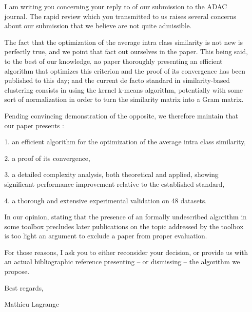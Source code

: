 \documentclass[a4paper,fleqn]{article}
\begin{document}
I am writing you concerning your reply to of our submission to the ADAC journal. The rapid review which you transmitted to us raises several concerns about our submission that we believe are not quite admissible.

The fact that the optimization of the average intra class similarity is not new is perfectly true, and we point that fact out ourselves in the paper. This being said, to the best of our knowledge, no paper thoroughly presenting an efficient algorithm that optimizes this criterion and the proof of its convergence has been published to this day; and the current de facto standard in similarity-based clustering consists in using the kernel k-means algorithm, potentially with some sort of normalization in order to turn the similarity matrix into a Gram matrix.

Pending convincing demonstration of the opposite, we therefore maintain that our paper presents : 

  1.  an efficient algorithm for the optimization of the average intra class similarity,

 2.   a proof of its convergence,

 3.   a detailed complexity analysis, both theoretical and applied, showing significant performance improvement relative to the established standard,

 4.   a thorough and extensive experimental validation on 48 datasets.


In our opinion, stating that the presence of an formally undescribed algorithm in some toolbox precludes later publications on the topic addressed by the toolbox is too light an argument to exclude a paper from proper evaluation.

For those reasons, I ask you to either reconsider your decision, or provide us with an actual bibliographic reference presenting -- or dismissing -- the algorithm we propose.

Best regards,

Mathieu Lagrange
\end{document}
